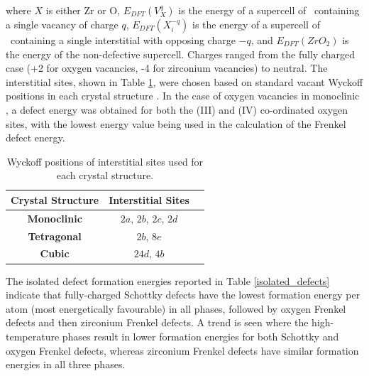 where $X$ is either Zr or O, $E_{DFT}(V^{q}_{X})$ is the energy of a supercell of \zirconia\ containing a single vacancy of charge $q$, $E_{DFT}(X^{-q}_{i})$ is the energy of a supercell of \zirconia\ containing a single interstitial with opposing charge $-q$, and $E_{DFT}(ZrO_2)$ is the energy of the non-defective supercell. Charges ranged from the fully charged case (+2 for oxygen vacancies, -4 for zirconium vacancies) to neutral. The interstitial sites, shown in Table \ref{table:interstitials}, were chosen based on standard vacant Wyckoff positions in each crystal structure \cite{theo1996international}.  In the case of oxygen vacancies in monoclinic \zirconia , a defect energy was obtained for both the (III) and (IV) co-ordinated oxygen sites, with the lowest energy value being used in the calculation of the Frenkel defect energy.

\begin{table}[ht] %
\onehalfspacing
\centering
\caption{Wyckoff positions of interstitial sites used for each crystal structure.}
\label{table:interstitials}
\begin{tabular}{lcc}
\hline
\hspace{0.7 cm} {\bf Crystal Structure} \hspace{0.7 cm}                              & \hspace{0.7 cm} {\bf Interstitial Sites} \hspace{0.7 cm}                                               \\ \hline
\multicolumn{1}{c}{\textbf{Monoclinic}}              & $2a$, $2b$, $2c$, $2d$ \\
\multicolumn{1}{c}{\textbf{Tetragonal}}            & $2b$, $8e$                                   \\
\multicolumn{1}{c}{\textbf{Cubic}}       & $24d$, $4b$                                          \\ \hline
\end{tabular}
\end{table}

The isolated defect formation energies reported in Table \ref{isolated_defects} indicate that fully-charged Schottky defects have the lowest formation energy per atom (most energetically favourable) in all phases, followed by oxygen Frenkel defects and then zirconium Frenkel defects. A trend is seen where the high-temperature phases result in lower formation energies for both Schottky and oxygen Frenkel defects, whereas zirconium Frenkel defects have similar formation energies in all three phases. 

